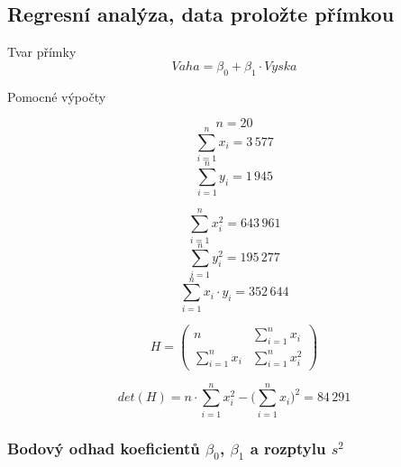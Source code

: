 \subsection{Regresní analýza, data proložte přímkou}

\begin{compactitem}
    \item Tvar přímky
    $${\displaystyle Vaha = \beta_0 + \beta_1 \cdot Vyska}$$

    \item Pomocné výpočty
\end{compactitem}

\begin{minipage}{0.49\textwidth}
    $${\displaystyle n = 20}$$
    $${\displaystyle \sum_{i=1}^n x_i = 3 \, 577}$$
    $${\displaystyle \sum_{i=1}^n y_i = 1 \, 945}$$
\end{minipage}
%
\begin{minipage}{0.49\textwidth}
    $${\displaystyle \sum_{i=1}^n x_i^2 = 643 \, 961}$$
    $${\displaystyle \sum_{i=1}^n y_i^2 = 195 \, 277}$$
    $${\displaystyle \sum_{i=1}^n x_i \cdot y_i = 352 \, 644}$$
\end{minipage}

$${\displaystyle
    H = \begin{pmatrix}
        n                       & \sum\limits_{i=1}^n x_i   \\
        \sum\limits_{i=1}^n x_i & \sum\limits_{i=1}^n x_i^2
    \end{pmatrix}
}$$

$${\displaystyle det(H) = n \cdot \sum_{i=1}^n x_i^2 - \Bigg( \sum_{i=1}^n x_i \Bigg)^2 = 84 \, 291}$$

\subsubsection*{Bodový odhad koeficientů ${\displaystyle \beta_0}$, ${\displaystyle \beta_1}$ a rozptylu ${\displaystyle s^2}$}

